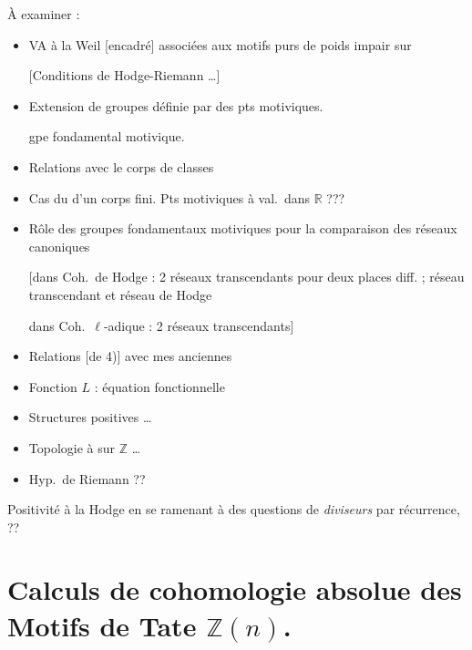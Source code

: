 \documentclass[11pt,a4paper]{article}
\begin{document}
À examiner :
\begin{itemize}
  \item[0)] VA à la Weil [encadré] associées aux motifs purs de poids impair
  sur \ill{}

  [Conditions de Hodge-Riemann …]
  \item[OK * (1)] Extension de groupes définie par des pts motiviques.

  \ill{} gpe fondamental motivique.
  \item[(2)] Relations avec le corps de classes
  \item[OK (3)] Cas du  d'un corps fini. Pts motiviques
  \ill{} à val.\ dans $\mathbb{R}$ ???
  \item[* 4)] Rôle des groupes fondamentaux motiviques pour la comparaison des
  réseaux canoniques

  [dans Coh.\ de Hodge : 2 réseaux transcendants pour deux places diff. ;
  réseau transcendant et réseau de Hodge

  dans Coh.\ $\ell$-adique : 2 réseaux transcendants]
  \item[5)] Relations [de 4)] avec mes \ill{} anciennes
  \item[6)] Fonction $L$ : équation fonctionnelle
  \item[OK 7)] Structures positives …
  \item[8)] Topologie à  sur $\mathbb{Z}$ …
  \item[9)] Hyp.\ de Riemann ??
\end{itemize}


Positivité à la Hodge en se ramenant à des questions de \emph{diviseurs}
par récurrence, \ill{}  ??

\section{Calculs de cohomologie absolue des Motifs de Tate $\mathbb{Z}(n)$.}

\end{document}
